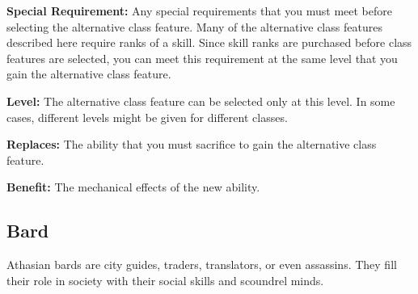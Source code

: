 \textbf{Special Requirement:} Any special requirements that you must meet before selecting the alternative class feature. Many of the alternative class features described here require ranks of a skill. Since skill ranks are purchased before class features are selected, you can meet this requirement at the same level that you gain the alternative class feature.

\textbf{Level:} The alternative class feature can be selected only at this level. In some cases, different levels might be given for different classes.

\textbf{Replaces:} The ability that you must sacrifice to gain the alternative class feature.

\textbf{Benefit:} The mechanical effects of the new ability.


\subsection{Bard}
Athasian bards are city guides, traders, translators, or even assassins. They fill their role in society with their social skills and scoundrel minds.

